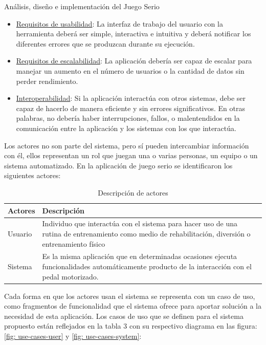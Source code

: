\begin{thesischapter}{2} {Análisis, diseño e implementación del Juego Serio}
    \begin{itemize}
        \item \underline{Requisitos de usabilidad}: La interfaz de trabajo del usuario con la herramienta deberá ser simple, interactiva e intuitiva y deberá notificar los diferentes errores que se produzcan durante su ejecución.
        \item \underline{Requisitos de escalabilidad}: La aplicación debería ser capaz de escalar para manejar un aumento en el número de usuarios o la cantidad de datos sin perder rendimiento.     
        \item \underline{Interoperabilidad}: Si la aplicación interactúa con otros sistemas, debe ser capaz de hacerlo de manera eficiente y sin errores significativos. En otras palabras, no debería haber interrupciones, fallos, o malentendidos en la comunicación entre la aplicación y los sistemas con los que interactúa.
    \end{itemize}

    \newpage
    Los actores no son parte del sistema, pero sí pueden intercambiar información con él, ellos representan un rol que juegan una o varias personas, un equipo o un sistema automatizado. En la aplicación
    de juego serio se identificaron los siguientes actores:

    \begin{table}[ht]
        \centering
        \begin{tabularx}{\textwidth}{|l|X|}
            \hline
            \textbf{Actores} & \textbf{Descripción} \\\hline
            Usuario & Individuo que interactúa con el sistema para hacer uso de una rutina de entrenamiento
            como medio de rehabilitación, diversión o entrenamiento físico \\\hline
            Sistema & Es la misma aplicación que en determinadas ocasiones ejecuta funcionalidades automáticamente producto de la interacción con el pedal motorizado. \\\hline
        \end{tabularx}
        \label{tab: actores}
        \caption{Descripción de actores}
    \end{table}

    Cada forma en que los actores usan el sistema se representa con un caso de 
    uso, como fragmentos de funcionalidad que el sistema ofrece para aportar solución a la necesidad de esta aplicación. 
    Los casos de uso que se definen para el sistema propuesto están reflejados en la tabla 3 con su respectivo diagrama
    en las figura: \ref{fig: use-cases-user} y \ref{fig: use-cases-system}:


\end{thesischapter}
